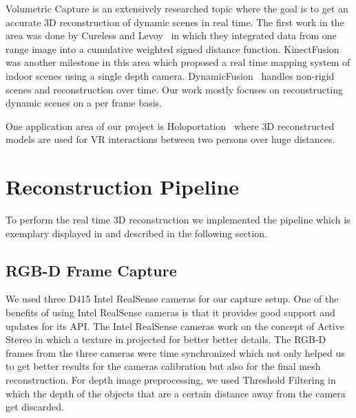 \documentclass[10pt,twocolumn,letterpaper]{article}
\begin{document}
Volumetric Capture is an extensively researched topic where the goal is to get an accurate 3D reconstruction of dynamic scenes in real time. The first work in the area was done by Cureless and Levoy~\cite{Authors4} in which they integrated data from one range image into a cumulative weighted signed distance function. KinectFusion~\cite{Authors5} was another milestone in this area which proposed a real time mapping system of indoor scenes using a single depth camera. DynamicFusion~\cite{Authors6} handles non-rigid scenes and reconstruction over time. Our work mostly focuses on reconstructing dynamic scenes on a per frame basis. 

One application area of our project is Holoportation~\cite{Authors7} where 3D reconstructed models are used for VR interactions between two persons over huge distances.

\section{Reconstruction Pipeline}
To perform the real time 3D reconstruction we implemented the pipeline which is exemplary displayed in  and described in the following section.

\subsection{RGB-D Frame Capture}
We used three D415 Intel RealSense cameras for our capture setup. One of the benefits of using Intel RealSense cameras is that it provides good support and updates for its API. The Intel RealSense cameras work on the concept of Active Stereo in which a texture in projected for better better details. The RGB-D frames from the three cameras were time synchronized which not only helped us to get better results for the cameras calibration but also for the final mesh reconstruction. For depth image preprocessing, we used Threshold Filtering in which the depth of the objects that are a certain distance away from the camera get discarded.
\end{document}
